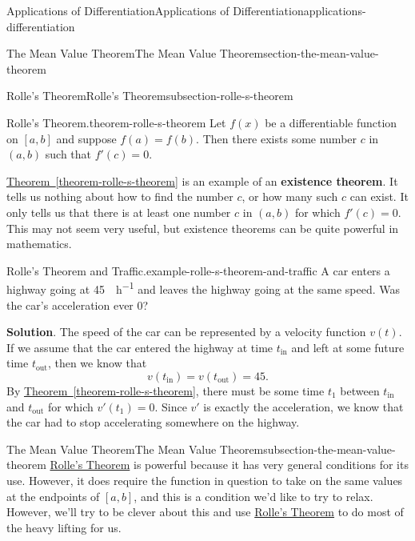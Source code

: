 \documentclass[oneside,10pt,]{book}
\newcommand{\terminology}[1]{\textbf{#1}}
\numberwithin{equation}{section}
\begin{document}
\begin{chapterptx}{Applications of Differentiation}{}{Applications of Differentiation}{}{}{applications-differentiation}
\begin{sectionptx}{The Mean Value Theorem}{}{The Mean Value Theorem}{}{}{section-the-mean-value-theorem}
\begin{subsectionptx}{Rolle's Theorem}{}{Rolle's Theorem}{}{}{subsection-rolle-s-theorem}
\begin{theorem}{Rolle's Theorem.}{}{theorem-rolle-s-theorem}%
\hypertarget{p-330}{}%
Let \(f(x)\) be a differentiable function on \([a,b]\) and suppose \(f(a) = f(b)\). Then there exists some number \(c\) in \((a,b)\) such that \(f'(c) = 0\).%
\end{theorem}
\hypertarget{p-331}{}%
\hyperref[theorem-rolle-s-theorem]{Theorem~\ref{theorem-rolle-s-theorem}} is an example of an \terminology{existence theorem}. It tells us nothing about how to find the number \(c\), or how many such \(c\) can exist. It only tells us that there is at least one number \(c\) in \((a,b)\) for which \(f'(c) = 0\). This may not seem very useful, but existence theorems can be quite powerful in mathematics.%
\begin{example}{Rolle's Theorem and Traffic.}{example-rolle-s-theorem-and-traffic}%
\hypertarget{p-332}{}%
A car enters a highway going at \SI{45}{\mile\per\hour} and leaves the highway going at the same speed. Was the car's acceleration ever \(0\)?%
\par\smallskip%
\noindent\textbf{Solution}.\hypertarget{solution-73}{}\quad%
\hypertarget{p-333}{}%
The speed of the car can be represented by a velocity function \(v(t)\). If we assume that the car entered the highway at time \(t_{\text{in}}\) and left at some future time \(t_{\text{out}}\), then we know that%
\begin{equation*}
v(t_{\text{in}}) = v(t_{\text{out}}) = 45.
\end{equation*}
By \hyperref[theorem-rolle-s-theorem]{Theorem~\ref{theorem-rolle-s-theorem}}, there must be some time \(t_{1}\) between \(t_{\text{in}}\) and \(t_{\text{out}}\) for which \(v'(t_{1}) = 0\). Since \(v'\) is exactly the acceleration, we know that the car had to stop accelerating somewhere on the highway.%
\end{example}
\end{subsectionptx}
%
%
\typeout{************************************************}
\typeout{************************************************}
%
\begin{subsectionptx}{The Mean Value Theorem}{}{The Mean Value Theorem}{}{}{subsection-the-mean-value-theorem}
\hypertarget{p-334}{}%
\hyperref[theorem-rolle-s-theorem]{Rolle's Theorem} is powerful because it has very general conditions for its use. However, it does require the function in question to take on the same values at the endpoints of \([a,b]\), and this is a condition we'd like to try to relax. However, we'll try to be clever about this and use \hyperref[theorem-rolle-s-theorem]{Rolle's Theorem} to do most of the heavy lifting for us.%

\end{subsectionptx}
\end{sectionptx}
\end{chapterptx}
\end{document}
